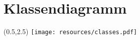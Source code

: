 \newpage

\section{Klassendiagramm}
\label{uml-classes}

\begin{textblock}{3}(0.5,2.5)
\texttt{[image: resources/classes.pdf]}
\end{textblock}

\newpage